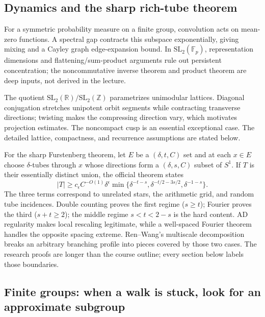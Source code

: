 \hypertarget{04-visual-computing-ii-ch033-dynamics-connect-projection-growth-to-rich-tubes}{}

\subsection{Dynamics and the sharp rich-tube theorem}\label{04-visual-computing-ii-ch033-dynamics-and-the-sharp-rich-tube-theorem}

\hypertarget{04-visual-computing-ii-ch033-dynamics-and-the-sharp-rich-tube-theorem}{}

For a symmetric probability measure on a finite group, convolution acts on mean-zero functions. A spectral gap contracts this subspace exponentially, giving mixing and a Cayley graph edge-expansion bound. In \(\mathrm{SL}_2(\mathbb F_p)\), representation dimensions and flattening/sum-product arguments rule out persistent concentration; the noncommutative inverse theorem and product theorem are deep inputs, not derived in the lecture.

The quotient \(\mathrm{SL}_2(\mathbb R)/\mathrm{SL}_2(\mathbb Z)\) parametrizes unimodular lattices. Diagonal conjugation stretches unipotent orbit segments while contracting transverse directions; twisting makes the compressing direction vary, which motivates projection estimates. The noncompact cusp is an essential exceptional case. The detailed lattice, compactness, and recurrence assumptions are stated below.

For the sharp Furstenberg theorem, let \(E\) be a \((\delta,t,C)\) set and at each \(x\in E\) choose \(\delta\)-tubes through \(x\) whose directions form a \((\delta,s,C)\) subset of \(S^1\). If \(T\) is their essentially distinct union, the official theorem states \[|T|\ge c_\epsilon C^{-O(1)}\delta^\epsilon
\min\{\delta^{-t-s},\delta^{-t/2-3s/2},\delta^{-1-s}\}.\] The three terms correspond to unrelated stars, the arithmetic grid, and random tube incidences. Double counting proves the first regime (\(s\ge t\)); Fourier proves the third (\(s+t\ge2\)); the middle regime \(s<t<2-s\) is the hard content. AD regularity makes local rescaling legitimate, while a well-spaced Fourier theorem handles the opposite spacing extreme. Ren--Wang's multiscale decomposition breaks an arbitrary branching profile into pieces covered by those two cases. The research proofs are longer than the course outline; every section below labels those boundaries.

\subsection{Finite groups: when a walk is stuck, look for an approximate subgroup}\label{04-visual-computing-ii-ch033-finite-groups-when-a-walk-is-stuck-look-for-an-approximate-subgroup-1}

